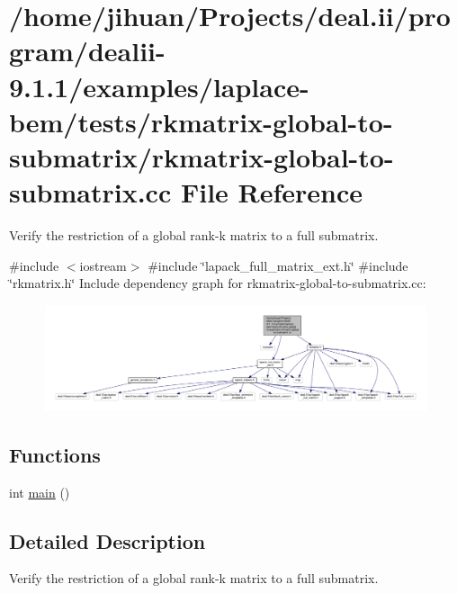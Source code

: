 \hypertarget{rkmatrix-global-to-submatrix_8cc}{}\section{/home/jihuan/\+Projects/deal.ii/program/dealii-\/9.1.1/examples/laplace-\/bem/tests/rkmatrix-\/global-\/to-\/submatrix/rkmatrix-\/global-\/to-\/submatrix.cc File Reference}
\label{rkmatrix-global-to-submatrix_8cc}


Verify the restriction of a global rank-\/k matrix to a full submatrix.  


{\ttfamily \#include $<$iostream$>$}\newline
{\ttfamily \#include \char`\"{}lapack\+\_\+full\+\_\+matrix\+\_\+ext.\+h\char`\"{}}\newline
{\ttfamily \#include \char`\"{}rkmatrix.\+h\char`\"{}}\newline
Include dependency graph for rkmatrix-\/global-\/to-\/submatrix.cc\+:
\nopagebreak
\begin{figure}[H]
\begin{center}
\leavevmode
\includegraphics[width=350pt]{rkmatrix-global-to-submatrix_8cc__incl}
\end{center}
\end{figure}
\subsection*{Functions}
\begin{DoxyCompactItemize}
\item 
int \hyperlink{rkmatrix-global-to-submatrix_8cc_ae66f6b31b5ad750f1fe042a706a4e3d4}{main} ()
\end{DoxyCompactItemize}


\subsection{Detailed Description}
Verify the restriction of a global rank-\/k matrix to a full submatrix. 

